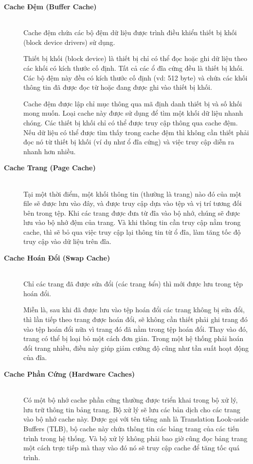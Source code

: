 \documentclass{article}
\begin{document}
\begin{description}
  \item[\textbf{Cache Đệm (Buffer Cache)}]\hfill \\ Cache đệm chứa các bộ đệm dữ liệu được trình điều khiển thiết bị khối (block device drivers) sử dụng.
  
  Thiết bị khối (block device) là thiết bị chỉ có thể đọc hoặc ghi dữ liệu theo các khối có kích thước cố định. Tất cả các ổ đĩa cứng đều là thiết bị khối. Các bộ đệm này đều có kích thước cố định (vd: 512 byte) và chứa các khối thông tin đã được đọc từ hoặc đang được ghi vào thiết bị khối. 

  Cache đệm được lập chỉ mục thông qua mã định danh thiết bị và số khối mong muốn. Loại cache này được sử dụng để tìm một khối dữ liệu nhanh chóng. Các thiết bị khối chỉ có thể được truy cập thông qua cache đệm. Nếu dữ liệu có thể được tìm thấy trong cache đệm thì không cần thiết phải đọc nó từ thiết bị khối (ví dụ như ổ đĩa cứng) và việc truy cập diễn ra nhanh hơn nhiều.
  \item[\textbf{Cache Trang (Page Cache)}]\hfill \\ Tại một thời điểm, một khối thông tin (thường là trang) nào đó của một file sẽ được lưu vào đây, và được truy cập dựa vào tệp và vị trí tương đối bên trong tệp. Khi các trang được đưa từ đĩa vào bộ nhớ, chúng sẽ được lưu vào bộ nhớ đệm của trang. Và khi thông tin cần truy cập nằm trong cache, thì sẽ bỏ qua việc truy cập lại thông tin từ ổ đĩa, làm tăng tốc độ truy cập vào dữ liệu trên đĩa.
  \item[\textbf{Cache Hoán Đổi (Swap Cache)}]\hfill \\ Chỉ các trang đã được sửa đổi (các trang \textit{bẩn}) thì mới được lưu trong tệp hoán đổi.
  
  Miễn là, sau khi đã được lưu vào tệp hoán đổi các trang không bị sửa đổi, thì lần tiếp theo trang được hoán đổi, sẽ không cần thiết phải ghi trang đó vào tệp hoán đổi nữa vì trang đó đã nằm trong tệp hoán đổi. Thay vào đó, trang có thể bị loại bỏ một cách đơn giản. Trong một hệ thống phải hoán đổi trang nhiều, điều này giúp giảm cường độ cũng như tần suất hoạt động của đĩa.
  \item[\textbf{Cache Phần Cứng (Hardware Caches)}]\hfill \\ Có một bộ nhớ cache phần cứng thường được triển khai trong bộ xử lý, lưu trữ thông tin bảng trang. Bộ xử lý sẽ lưu các bản dịch cho các trang vào bộ nhớ cache này. Được gọi với tên tiếng anh là Translation Look-aside Buffers (TLB), bộ cache này chứa thông tin các bảng trang của các tiến trình trong hệ thống. Và bộ xử lý không phải bao giờ cũng đọc bảng trang một cách trực tiếp mà thay vào đó nó sẽ truy cập cache để tăng tốc quá trình.
  

\end{description}
\end{document}
